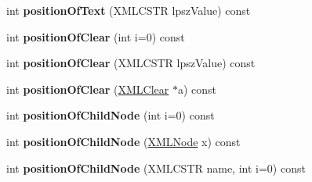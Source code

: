 \begin{DoxyCompactItemize}
\item 
\hypertarget{struct_x_m_l_node_a23d8731aafccd6153a3a7351a80b278e}{}\label{struct_x_m_l_node_a23d8731aafccd6153a3a7351a80b278e} 
int {\bfseries position\+Of\+Text} (X\+M\+L\+C\+S\+TR lpsz\+Value) const
\item 
\hypertarget{struct_x_m_l_node_a5ac10cf45468302f26d4932bf4678a95}{}\label{struct_x_m_l_node_a5ac10cf45468302f26d4932bf4678a95} 
int {\bfseries position\+Of\+Clear} (int i=0) const
\item 
\hypertarget{struct_x_m_l_node_ab0cab901f9feff22a76929d011e7a08d}{}\label{struct_x_m_l_node_ab0cab901f9feff22a76929d011e7a08d} 
int {\bfseries position\+Of\+Clear} (X\+M\+L\+C\+S\+TR lpsz\+Value) const
\item 
\hypertarget{struct_x_m_l_node_a04d7989f7a460a1bcd200be5376e2467}{}\label{struct_x_m_l_node_a04d7989f7a460a1bcd200be5376e2467} 
int {\bfseries position\+Of\+Clear} (\hyperlink{struct_x_m_l_clear}{X\+M\+L\+Clear} $\ast$a) const
\item 
\hypertarget{struct_x_m_l_node_a325d7fa417ea2461e03792386cbebdef}{}\label{struct_x_m_l_node_a325d7fa417ea2461e03792386cbebdef} 
int {\bfseries position\+Of\+Child\+Node} (int i=0) const
\item 
\hypertarget{struct_x_m_l_node_a1e28b439f9616c680fd0af893de67c01}{}\label{struct_x_m_l_node_a1e28b439f9616c680fd0af893de67c01} 
int {\bfseries position\+Of\+Child\+Node} (\hyperlink{struct_x_m_l_node}{X\+M\+L\+Node} x) const
\item 
\hypertarget{struct_x_m_l_node_a4a03f749176c9b4ddc680bf76c304b0c}{}\label{struct_x_m_l_node_a4a03f749176c9b4ddc680bf76c304b0c} 
int {\bfseries position\+Of\+Child\+Node} (X\+M\+L\+C\+S\+TR name, int i=0) const
\end{DoxyCompactItemize}
